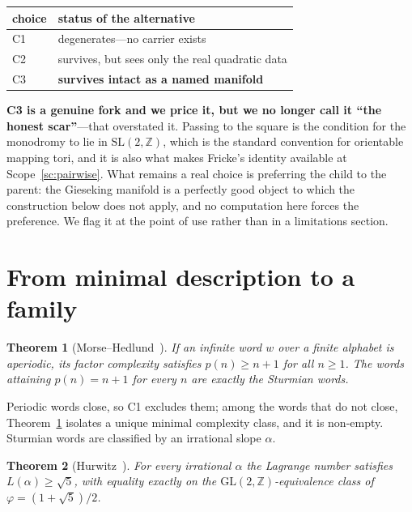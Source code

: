 \documentclass[11pt,reqno]{amsart}
\theoremstyle{plain}
\newtheorem{theorem}{Theorem}[section]
\theoremstyle{definition}
\theoremstyle{remark}
\newcommand{\Z}{\mathbb{Z}}
\newcommand{\SL}{\mathrm{SL}}
\newcommand{\GL}{\mathrm{GL}}
\begin{document}
\begin{table}[htbp]
\centering
\begin{tabular}{@{}ll@{}}
\toprule
choice & status of the alternative\\
\midrule
C1 & degenerates---no carrier exists\\
C2 & survives, but sees only the real quadratic data\\
C3 & \textbf{survives intact as a named manifold}\\
\bottomrule
\end{tabular}
\end{table}

\textbf{C3 is a genuine fork and we price it, but we no longer call it ``the honest
scar''}---that overstated it. Passing to the square is the condition for the monodromy to
lie in $\SL(2,\Z)$, which is the standard convention for orientable mapping tori, and it
is also what makes Fricke's identity available at Scope~\ref{sc:pairwise}. What remains a
real choice is preferring the child to the parent: the Gieseking manifold is a perfectly
good object to which the construction below does not apply, and no computation here
forces the preference. We flag it at the point of use rather than in a limitations
section.

\section{From minimal description to a family}\label{sec:genesis}

\begin{theorem}[Morse--Hedlund~\cite{MorseHedlund}]\label{thm:mh}
If an infinite word $w$ over a finite alphabet is aperiodic, its factor complexity
satisfies $p(n)\ge n+1$ for all $n\ge1$. The words attaining $p(n)=n+1$ for every $n$
are exactly the Sturmian words.
\end{theorem}

Periodic words close, so C1 excludes them; among the words that do not close,
Theorem~\ref{thm:mh} isolates a unique minimal complexity class, and it is non-empty.
Sturmian words are classified by an irrational slope $\alpha$.

\begin{theorem}[Hurwitz~\cite{Hurwitz}]\label{thm:hurwitz}
For every irrational $\alpha$ the Lagrange number satisfies $L(\alpha)\ge\sqrt5$, with
equality exactly on the $\GL(2,\Z)$-equivalence class of $\varphi=(1+\sqrt5)/2$.
\end{theorem}
\end{document}
